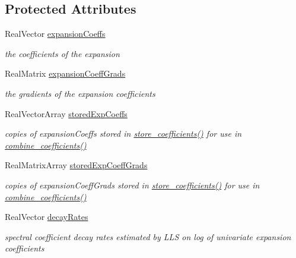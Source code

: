 \subsection*{Protected Attributes}
\begin{DoxyCompactItemize}
\item 
Real\+Vector \hyperlink{classPecos_1_1OrthogPolyApproximation_a2f49361bc93de38b3804a32d14ec9da2}{expansion\+Coeffs}\label{classPecos_1_1OrthogPolyApproximation_a2f49361bc93de38b3804a32d14ec9da2}

\begin{DoxyCompactList}\small\item\em the coefficients of the expansion \end{DoxyCompactList}\item 
Real\+Matrix \hyperlink{classPecos_1_1OrthogPolyApproximation_aafa9e6fb757964c3ce070ae4f980b6af}{expansion\+Coeff\+Grads}
\begin{DoxyCompactList}\small\item\em the gradients of the expansion coefficients \end{DoxyCompactList}\item 
Real\+Vector\+Array \hyperlink{classPecos_1_1OrthogPolyApproximation_a644b1a5bba418a7f83d3222881eb701d}{stored\+Exp\+Coeffs}\label{classPecos_1_1OrthogPolyApproximation_a644b1a5bba418a7f83d3222881eb701d}

\begin{DoxyCompactList}\small\item\em copies of expansion\+Coeffs stored in \hyperlink{classPecos_1_1OrthogPolyApproximation_abc17a7104c33d8146f4a0ee7b6c6f37a}{store\+\_\+coefficients()} for use in \hyperlink{classPecos_1_1OrthogPolyApproximation_a7c794213befc83c9f90137f22e4cd39d}{combine\+\_\+coefficients()} \end{DoxyCompactList}\item 
Real\+Matrix\+Array \hyperlink{classPecos_1_1OrthogPolyApproximation_acbc4f397b56c437fd8c956c59ae081d8}{stored\+Exp\+Coeff\+Grads}\label{classPecos_1_1OrthogPolyApproximation_acbc4f397b56c437fd8c956c59ae081d8}

\begin{DoxyCompactList}\small\item\em copies of expansion\+Coeff\+Grads stored in \hyperlink{classPecos_1_1OrthogPolyApproximation_abc17a7104c33d8146f4a0ee7b6c6f37a}{store\+\_\+coefficients()} for use in \hyperlink{classPecos_1_1OrthogPolyApproximation_a7c794213befc83c9f90137f22e4cd39d}{combine\+\_\+coefficients()} \end{DoxyCompactList}\item 
Real\+Vector \hyperlink{classPecos_1_1OrthogPolyApproximation_a4dff847cf479b3d67e81aec3937c9935}{decay\+Rates}\label{classPecos_1_1OrthogPolyApproximation_a4dff847cf479b3d67e81aec3937c9935}

\begin{DoxyCompactList}\small\item\em spectral coefficient decay rates estimated by L\+LS on log of univariate expansion coefficients \end{DoxyCompactList}\end{DoxyCompactItemize}
